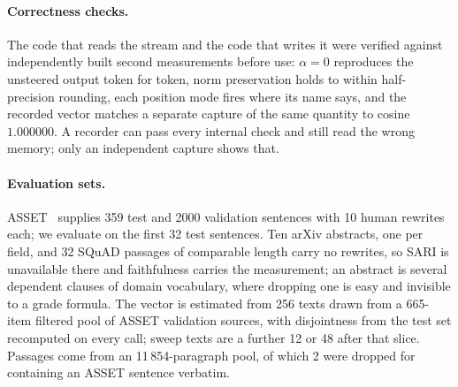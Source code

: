 \documentclass[aps,prb,reprint,nofootinbib,a4paper]{revtex4-2}
\begin{document}
\paragraph{Correctness checks.} The code that reads the stream and the code
that writes it were verified against independently built second measurements
before use: $\alpha=0$ reproduces the unsteered output token for token, norm
preservation holds to within half-precision rounding, each position mode fires
where its name says, and the recorded vector matches a separate capture of the
same quantity to cosine $1.000000$. A recorder can pass every internal check
and still read the wrong memory; only an independent capture shows that.

\paragraph{Evaluation sets.} ASSET~\cite{asset} supplies 359 test and 2000
validation sentences with 10 human rewrites each; we evaluate on the first 32
test sentences. Ten arXiv abstracts, one per field, and 32 SQuAD passages of
comparable length carry no rewrites, so SARI is unavailable there and
faithfulness carries the measurement; an abstract is several dependent clauses
of domain vocabulary, where dropping one is easy and invisible to a grade
formula. The vector is estimated from 256 texts drawn from a 665-item filtered
pool of ASSET validation sources, with disjointness from the test set
recomputed on every call; sweep texts are a further 12 or 48 after that slice.
Passages come from an 11\,854-paragraph pool, of which 2 were dropped for
containing an ASSET sentence verbatim.
\end{document}

